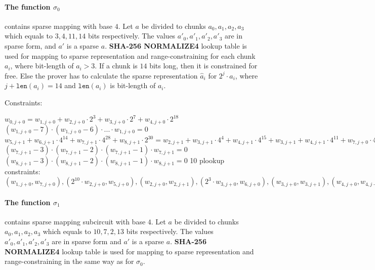 \paragraph{The function $\sigma_0$} contains sparse mapping with base $4$.
Let $a$ be divided to chunks $a_0, a_1, a_2, a_3$ which equals to $3, 4, 11, 14$ bits respectively.
The values $a'_0, a'_1, a'_2, a'_3$ are in sparse form, and $a'$ is a sparse $a$.
\textbf{SHA-256 NORMALIZE4} lookup table is used for mapping to sparse representation and range-constraining for each chunk $a_i$, where bit-length of $a_i > 3$.
If a chunk is $14$ bits long, then it is constrained for free.
Else the prover has to calculate the sparse representation $\hat{a}_i$ for $2^j \cdot a_i$, where $j + \texttt{len}(a_i) = 14$ and $\texttt{len}(a_i)$ is bit-length of $a_i$.

Constraints:
\begin{center}
    $w_{0, j + 0} = w_{1, j + 0} + w_{2,j + 0} \cdot 2^3 + w_{3,j + 0} \cdot 2^{7} + w_{4, j + 0} \cdot 2^{18}$ \\
    $(w_{1, j + 0} - 7) \cdot (w_{1, j + 0} - 6) \cdot ... \cdot w_{1, j + 0} = 0$ \\
    $w_{5, j + 1} + w_{6, j + 1} \cdot 4^{14} + w_{7, j + 1} \cdot 4^{28} + w_{8, j + 1} \cdot 2^{30} = w_{2, j + 1} + w_{3, j + 1} \cdot 4^{4} + w_{4, j + 1} \cdot 4^{15} + w_{3, j + 1} + w_{4, j + 1} \cdot 4^{11} + w_{7, j + 0} \cdot 4^{25} + w_{2, j + 1} \cdot 4^{28} + w_{4, j + 1} + w_{7, j + 0} \cdot 4^{14}+ w_{2, j + 1} \cdot 4^{17} + w_{3, j + 1} \cdot 4^{21}$ \\
    $(w_{7, j + 1} - 3) \cdot (w_{7, j + 1} - 2) \cdot (w_{7, j + 1} - 1) \cdot w_{7, j + 1} = 0$
    $(w_{8, j + 1} - 3) \cdot (w_{8, j + 1} - 2) \cdot (w_{8, j + 1} - 1) \cdot w_{8, j + 1} = 0$
    10 plookup constraints: $(w_{1, j + 0}, w_{7, j + 0}), ( 2^{10} \cdot w_{2, j + 0}, w_{5, j + 0}), (w_{2, j + 0}, w_{2, j + 1}), (2^3 \cdot w_{3, j + 0}, w_{6, j + 0}), (w_{3, j + 0}, w_{3, j + 1}), (w_{4, j + 0}, w_{4, j + 1}), (w_{1, j + 2}, w_{5, j + 1}), (w_{2, j + 2}, w_{6, j + 1}), (w_{3, j + 2}, w_{7, j + 2}), (w_{4, j + 2}, w_{8, j + 2})$ \\
\end{center}

\paragraph{The function $\sigma_1$} contains sparse mapping subcircuit with base $4$.
Let $a$ be divided to chunks $a_0, a_1, a_2, a_3$ which equals to $10, 7, 2, 13$ bits respectively.
The values $a'_0, a'_1, a'_2, a'_3$ are in sparse form and $a'$ is a sparse $a$.
\textbf{SHA-256 NORMALIZE4} lookup table is used for mapping to sparse representation and range-constraining in the same way as for $\sigma_0$.

